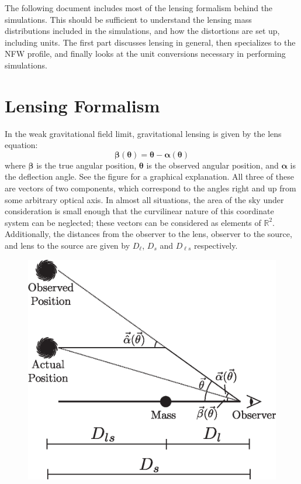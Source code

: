 \documentclass[10pt,twoside]{article}
\theoremstyle{definition}
\theoremstyle{exercise}
\newcommand{\R}{\mathbb{R}}
\renewcommand{\v}[1]{\boldsymbol{#1}}%
\begin{document}
The following document includes most of the lensing formalism behind the simulations. This should be sufficient to understand the lensing mass distributions included in the simulations, and how the distortions are set up, including units. The first part discusses lensing in general, then specializes to the NFW profile, and finally looks at the unit conversions necessary in performing simulations.

\section{Lensing Formalism}


In the weak gravitational field limit, gravitational lensing is given by the lens equation:\cite{Narayan:1996ba}
\begin{equation}
		\v{\beta}(\v{\theta}) = \v{\theta} - \v{\alpha}(\v{\theta})
		\label{eq:lens}
\end{equation}
where $\v{\beta}$ is the true angular position, $\v{\theta}$ is the observed angular position, and $\v{\alpha}$ is the deflection angle. See the figure for a graphical explanation. All three of these are vectors of two components, which correspond to the angles right and up from some arbitrary optical axis. In almost all situations, the area of the sky under consideration is small enough that the curvilinear nature of this coordinate system can be neglected; these vectors can be considered as elements of $\R^2$. Additionally, the distances from the observer to the lens, observer to the source, and lens to the source are given by $D_\ell$, $D_s$ and $D_{\ell s}$ respectively.

\begin{figure}[h]
		\center
		\includegraphics[scale=0.7]{images/lensing_formalism.eps}
\end{figure}
\end{document}
